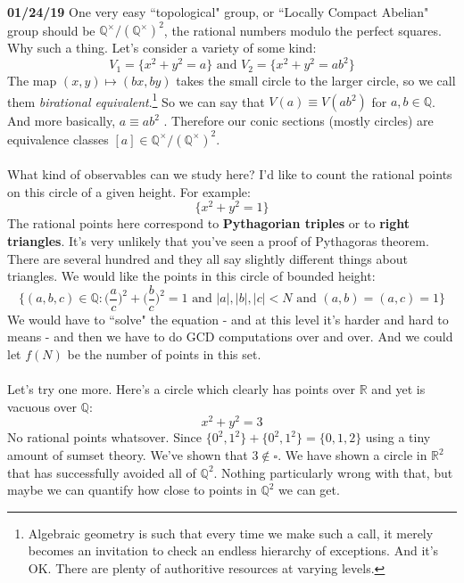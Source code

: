 \documentclass[12pt]{article}
\begin{document}
\newpage


\noindent \textbf{01/24/19} One very easy ``topological" group, or ``Locally Compact Abelian" group should be $\mathbb{Q}^\times/(\mathbb{Q}^\times)^2$, the rational numbers modulo the perfect squares.  Why such a thing.  Let's consider a variety of some kind:
$$ V_1  = \{ x^2 + y^2 = a \}  \text{ and } V_2 = \{ x^2 + y^2 = ab^2 \}$$
The map $(x,y) \mapsto (bx,by)$ takes the small circle to the larger circle, so we call them \textit{birational equivalent}.\footnote{Algebraic geometry is such that every time we make such a call, it merely becomes an invitation to check an endless hierarchy of exceptions.  And it's OK.  There are plenty of authoritive resources at varying levels.}  So we can say that $V(a) \equiv V(ab^2)$ for $a,b \in \mathbb{Q}$.  And more basically, $a  \equiv ab^2$ .  Therefore our conic sections (mostly circles) are equivalence classes $[a] \in \mathbb{Q}^\times/(\mathbb{Q}^\times)^2$. \\ \\
What kind of observables can we study here?  I'd like to count the rational points on this circle of a given height.  For example:
$$ \{ x^2 + y^2 = 1 \} $$
The rational points here correspond to \textbf{Pythagorian triples}  or to \textbf{right triangles}.  It's very unlikely that you've seen a proof of Pythagoras theorem.  There are several hundred and they all say slightly different things about triangles.  We would like the points in this circle of bounded height:
$$ \Big\{ (a,b,c) \in \mathbb{Q} : \Big( \frac{a}{c}\Big)^2 + \Big(\frac{b}{c}\Big)^2 = 1 \text{ and } |a|,|b|,|c| < N \text{ and } (a,b)=(a,c)=1\Big\} $$
We would have to ``solve" the equation - and at this level it's harder and hard to means - and then we have to do GCD computations over and over.  And we could let $f(N)$ be the number of points in this set.  \\ \\
Let's try one more.  Here's a circle which clearly has points over $\mathbb{R}$ and yet is vacuous over $\mathbb{Q}$:
$$ x^2 + y^2 = 3 $$
No rational points whatsover.  Since $\{ 0^2, 1^2\} + \{ 0^2 , 1^2 \}  = \{ 0,1,2\}$ using a tiny amount of sumset theory.  We've shown that $3 \notin \square$.  We have shown a circle in $\mathbb{R}^2$ that has successfully avoided all of $\mathbb{Q}^2$.  Nothing particularly wrong with that, but maybe we can quantify how close to points in $\mathbb{Q}^2$ we can get.
\end{document}
